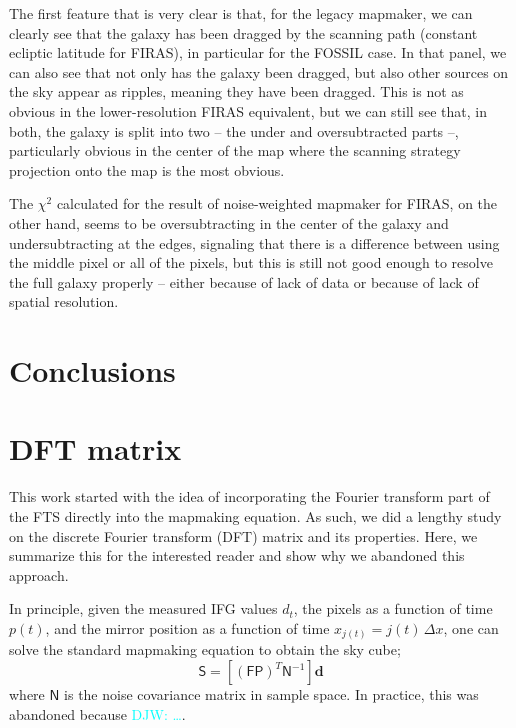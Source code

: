 \documentclass{aa}
\newcommand{\djw}[1]{\textcolor{cyan}{{DJW:} #1}}
\begin{document}
The first feature that is very clear is that, for the legacy mapmaker, we can clearly see that the galaxy has been dragged by the scanning path (constant ecliptic latitude for FIRAS), in particular for the FOSSIL case. In that panel, we can also see that not only has the galaxy been dragged, but also other sources on the sky appear as ripples, meaning they have been dragged. This is not as obvious in the lower-resolution FIRAS equivalent, but we can still see that, in both, the galaxy is split into two -- the under and oversubtracted parts --, particularly obvious in the center of the map where the scanning strategy projection onto the map is the most obvious.

The $\chi^2$ calculated for the result of noise-weighted mapmaker for FIRAS, on the other hand, seems to be oversubtracting in the center of the galaxy and undersubtracting at the edges, signaling that there is a difference between using the middle pixel or all of the pixels, but this is still not good enough to resolve the full galaxy properly -- either because of lack of data or because of lack of spatial resolution.

\section{Conclusions}
\label{sec:conclusions}

\appendix

\section{DFT matrix}

This work started with the idea of incorporating the Fourier transform part of the FTS directly into the mapmaking equation. As such, we did a lengthy study on the discrete Fourier transform (DFT) matrix and its properties. Here, we summarize this for the interested reader and show why we abandoned this approach.

In principle, given the measured IFG values $d_t$, the pixels as a function of time $p(t)$, and the mirror position as a function of time $x_{j(t)}=j(t)\,\Delta x$, one can solve the standard mapmaking equation to obtain the sky cube;
\begin{equation}
	[(\mathsf{FP})^T\mathsf N^{-1}\mathsf{FP}]\mathsf S
	=
	[(\mathsf{FP})^T\mathsf N^{-1}]\boldsymbol d
\end{equation}
where $\mathsf N$ is the noise covariance matrix in sample space. In practice, this was abandoned because \djw{\ldots}.
\end{document}
